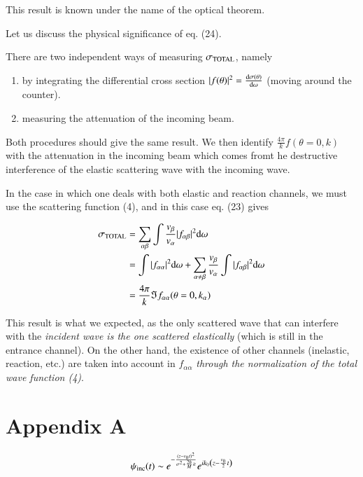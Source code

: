 \documentclass[a4paper,14pt]{book}
\begin{document}
\noindent This result is known under the name of the optical theorem.

Let us discuss the physical significance of eq. (24).

There are two independent ways of measuring $\sigma_{\rm TOTAL}$, namely

\begin{enumerate}
\item{by integrating the differential cross section $|f(\theta)|^2 = \frac{{\rm d}\sigma(\theta)}{{\rm d}\omega}$ (moving around the counter).}
\item{measuring the attenuation of the incoming beam.}
\end{enumerate}

Both procedures should give the same result. We then identify $\frac{4\pi}{k} f(\theta=0,k)$ with the attenuation in the incoming beam which comes fromt he destructive interference of the elastic scattering wave with the incoming wave.

In the case in which one deals with both elastic and reaction channels, we must use the scattering function (4), and in this case eq. (23) gives

\begin{equation}
\begin{split}
\sigma_{\rm TOTAL} &= \sum_{\alpha \beta} \int \frac{v_{\beta}}{v_{\alpha}} |f_{\alpha \beta}|^2 {\rm d}\omega \\
&= \int |f_{\alpha \alpha}|^2 {\rm d}\omega + \sum_{\alpha \neq \beta} \frac{v_{\beta}}{v_{\alpha}} \int |f_{\alpha \beta}|^2 {\rm d}\omega \\
&= \frac{4\pi}{k} \Im f_{\alpha \alpha}(\theta=0, k_{\alpha})
\end{split}
\end{equation}

This result is what we expected, as the only scattered wave that can interfere with the {\it incident wave is the one scattered elastically} (which is still in the entrance channel). On the other hand, the existence of other channels (inelastic, reaction, etc.) are taken into account in $f_{\alpha \alpha}$ {\it through the normalization of the total wave function (4)}.




\section{Appendix A}

\begin{equation}
\nonumber
\psi_{\rm inc}(t) \sim e^{- \frac{(z-v_0 t)^2}{\sigma^2 + \frac{2 \hbar}{M} i t}} e^{i k_0 \left( z - \frac{v_0}{2} t \right)}
\end{equation}
\end{document}
